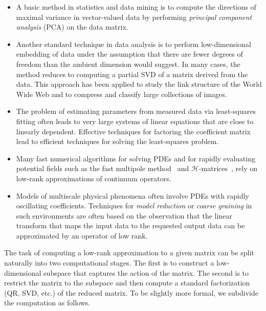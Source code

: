 \documentclass{article}
\begin{document}
\begin{itemize}
\item   A basic method in statistics and data mining is to compute the
directions of maximal variance in vector-valued data by performing
\emph{principal component analysis} (PCA) on the data matrix.


\item   Another standard technique in data analysis is to perform
low-dimensional embedding of data under the assumption that there
are fewer degrees of freedom than the ambient dimension would suggest.
In many cases, the method reduces to computing a partial SVD of a matrix
derived from the data.  %
This approach has been applied to study the link structure of the
World Wide Web and to compress and classify large
collections of images.


\item The problem of estimating parameters from measured data via
least-squares fitting often leads to very large systems of linear
equations that are close to linearly dependent. Effective techniques
for factoring the coefficient matrix lead to efficient techniques
for solving the least-squares problem.

\item   Many fast numerical algorithms for solving PDEs and for rapidly evaluating
potential fields such as the fast multipole method~\cite{rokhlin1997}
and $\mathcal{H}$-matrices~\cite{hackbusch2003}, rely on low-rank approximations of
continuum operators.

\item Models of multiscale physical phenomena often involve PDEs with rapidly
oscillating coefficients. Techniques for  \emph{model reduction}
or \emph{coarse graining} in such environments are often based %
on the observation that the linear transform that maps the input data to the requested output
data %
can be approximated by an operator of low rank.
\end{itemize}


The task of computing a low-rank approximation to a given matrix
can be split naturally into two computational stages. The first is
to construct a low-dimensional subspace that captures the action
of the matrix. The second is to restrict the matrix to the subspace
and then compute a standard factorization (QR, SVD, etc.) of the
reduced matrix.  To be slightly more formal, we subdivide the
computation as follows.
\end{document}
